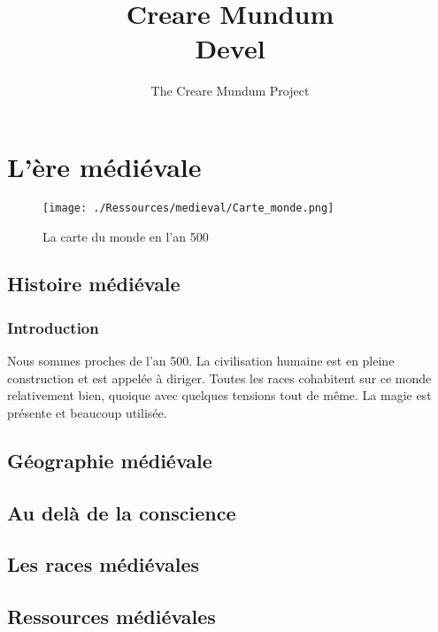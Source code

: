 \documentclass{book}
\title{Creare Mundum \\ Devel}
\author{The Creare Mundum Project}
\date{\oldstylenums{\insertdate}}
\begin{document}
\maketitle
\setcounter{tocdepth}{2} %
\renewcommand{\contentsname}{Sommaire} 
\tableofcontents

\part{L'ère médiévale}
\begin{figure}
\begin{center}
\hypertarget{cartedumonde}{}
\texttt{[image: ./Ressources/medieval/Carte\_monde.png]}
\caption{La carte du monde en l'an 500}
\end{center}
\end{figure}
\chapter{Histoire médiévale}
\section{Introduction}
Nous sommes proches de l'an 500. La civilisation humaine est en pleine construction et est appelée à diriger.
Toutes les races cohabitent sur ce monde relativement bien, quoique avec quelques tensions tout de même.
La magie est présente et beaucoup utilisée.


\chapter{Géographie médiévale}

 

\chapter{Au delà de la conscience}




\chapter{Les races médiévales}


\chapter{Ressources médiévales}

\end{document}
